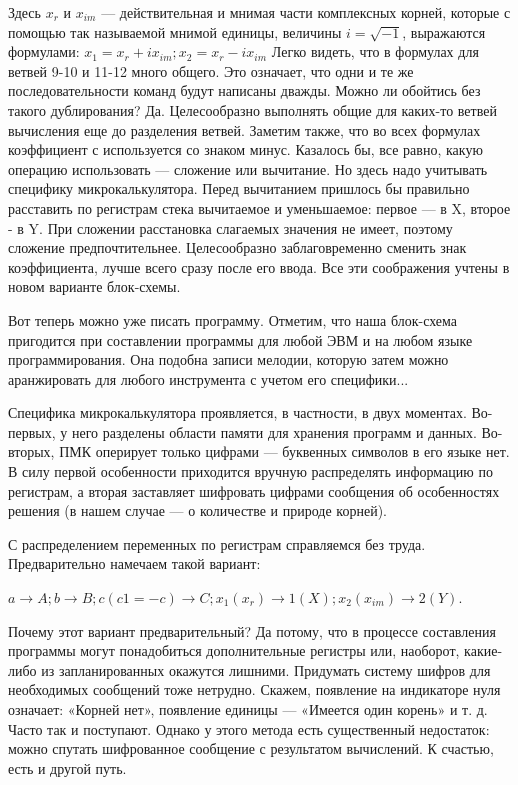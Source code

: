 \documentclass[11pt,a4paper,oneside]{article}
\begin{document}
Здесь $x_{r}$ и $x_{im}$ — действительная и мнимая части комплексных корней, которые с помощью так называемой мнимой единицы, величины $i=\sqrt{-1}$, выражаются формулами:
$x_{1}=x_{r} + ix_{im}; x_{2} = x_{r} - ix_{im}$ Легко видеть, что в формулах для ветвей 9-10 и 11-12 много общего. Это означает, что одни и те же последовательности команд будут написаны дважды. Можно ли обойтись без такого дублирования? Да. Целесообразно выполнять общие для каких-то ветвей вычисления еще до разделения ветвей. Заметим также, что во всех формулах коэффициент с используется со знаком минус. Казалось бы, все равно, какую операцию использовать — сложение или вычитание. Но здесь надо учитывать специфику микрокалькулятора. Перед вычитанием пришлось бы правильно расставить по регистрам стека вычитаемое и уменьшаемое: первое — в X, второе - в Y. При сложении расстановка слагаемых значения не имеет, поэтому сложение предпочтительнее. Целесообразно заблаговременно сменить знак коэффициента, лучше всего сразу после его ввода. Все эти соображения учтены в новом варианте блок-схемы.

Вот теперь можно уже писать программу. Отметим, что наша блок-схема пригодится при составлении программы для любой ЭВМ и на любом языке программирования. Она подобна записи мелодии, которую затем можно аранжировать для любого инструмента с учетом его специфики...

Специфика микрокалькулятора проявляется, в частности, в двух моментах. Во-первых, у него разделены области памяти для хранения программ и данных. Во-вторых, ПМК оперирует только цифрами — буквенных символов в его языке нет. В силу первой особенности приходится вручную распределять информацию по регистрам, а вторая заставляет шифровать цифрами сообщения об особенностях решения (в нашем случае — о количестве и природе корней).

С распределением переменных по регистрам справляемся без труда. Предварительно намечаем такой вариант:

$a \rightarrow A; b \rightarrow B; c (c1 = -c) \rightarrow C;
x_{1} (x_{r}) \rightarrow 1(X); x_{2}(x_{im}) \rightarrow 2(Y)$.

Почему этот вариант предварительный? Да потому, что в процессе составления программы могут понадобиться дополнительные регистры или, наоборот, какие-либо из запланированных окажутся лишними.
Придумать систему шифров для необходимых сообщений тоже нетрудно. Скажем, появление на индикаторе нуля означает: «Корней нет», появление единицы — «Имеется один корень» и т. д. Часто так и поступают. Однако у этого метода есть существенный недостаток: можно спутать шифрованное сообщение с результатом вычислений. К счастью, есть и другой путь.
\end{document}
